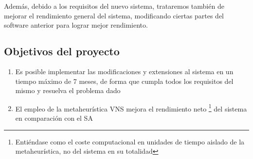 Además, debido a los requisitos del nuevo sistema, trataremos también de mejorar el rendimiento general del sistema, modificando ciertas partes del software anterior para lograr mejor rendimiento.

\subsection{Objetivos del proyecto}

\label{sec:mylabel}
\begin{enumerate}[label={H\arabic*}]
	\item[\namedlabel{H1}]  Es posible implementar las modificaciones y extensiones al sistema en un tiempo máximo de 7 meses, de forma que cumpla todos los requisitos del mismo y resuelva el problema dado %
	\item[\namedlabel{H2}]  El empleo de la metaheurística VNS mejora el rendimiento neto
	\footnote{Entiéndase como el coste computacional en unidades de tiempo aislado de la metaheurística, no del sistema en su totalidad}
	 del sistema en comparación con el SA
\end{enumerate}



